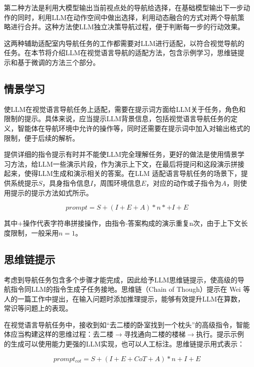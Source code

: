 \documentclass[bachelor]{thesis-uestc}
\begin{document}
第二种方法是利用大模型输出当前视点处的导航给选择，在基础模型输出下一步动作的同时，利用LLM在动作空间中做出选择，利用动态融合的方式对两个导航策略进行合并。这种方法使LLM独立决策导航过程，便于判断每一步的行动效果。

这两种辅助适配室内导航任务的工作都需要对LLM进行适配，以符合视觉导航的任务。在本节将介绍LLM在视觉语言导航的适配方法，包含示例学习，思维链提示和基于微调的方法三个部分。

\subsection{情景学习}

使LLM在视觉语言导航任务上适配，需要在提示词方面给LLM关于任务，角色和限制的提示。具体来说，应当提示LLM背景信息，包括视觉语言导航任务的定义，智能体在导航环境中允许的操作等，同时还需要在提示词中加入对输出格式的限制，便于后续的解析。

提供详细的指令提示有时并不能使LLM完全理解任务，更好的做法是使用情景学习方法，给LLM一些演示片段，作为演示上下文，在最后将提问和这段演示拼接起来，使得LLM生成和演示相关的答案。在LLM 适配语言导航任务的场景下，提供系统提示$S$，具身指令信息$I$，周围环境信息$E$，对应的动作或子指令为$A$，则使用提示的提示方法如式所示。

\begin{equation}
    prompt=S+(I+E+A)*n*+I+E
\label{icl}
\end{equation}

其中$+$操作代表字符串拼接操作，由指令-答案构成的演示重复n次，由于上下文长度限制，一般采用$n=1$。

\subsection{思维链提示}

考虑到导航任务包含多个步骤才能完成，因此给予LLM思维链提示，使高级的导航指令同LLM的指令生成子任务接地。思维链（Chain of Though）提示在 Wei 等人的一篇工作中提出，在输入问题时添加推理提示，能够有效提升LLM在算数，常识等问题上的表现。

在视觉语言导航任务中，接收到如“去二楼的卧室找到一个枕头”的高级指令，智能体应当构建这样的思维过程：去二楼$\rightarrow$寻找通向二楼的楼梯$\rightarrow$执行。提示示例的生成可以使用能力更强的LLM实现，也可以人工标注。思维链提示用式表示：

\begin{equation}
    prompt_{cot} = S+(I+E+CoT+A)*n+I+E
\label{cot}
\end{equation}
\end{document}
